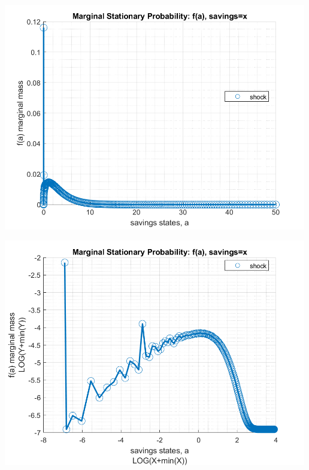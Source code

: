 \documentclass[
]{book}
\begin{document}
\includegraphics[width=5.20833in,height=\textheight]{img/fx_ds_az_cts_loop_images/figure_0.png}

\includegraphics[width=5.20833in,height=\textheight]{img/fx_ds_az_cts_loop_images/figure_1.png}
\end{document}
